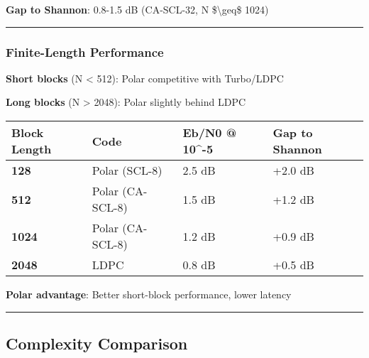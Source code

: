 \textbf{Gap to Shannon}: 0.8-1.5 dB (CA-SCL-32, N \$\textbackslash geq\$
1024)

\begin{center}\rule{0.5\linewidth}{0.5pt}\end{center}

\subsubsection{Finite-Length
Performance}\label{finite-length-performance}

\textbf{Short blocks} (N \textless{} 512): Polar competitive with
Turbo/LDPC

\textbf{Long blocks} (N \textgreater{} 2048): Polar slightly behind LDPC

{\def\LTcaptype{} %
\begin{longtable}[]{@{}llll@{}}
\toprule\noalign{}
Block Length & Code & Eb/N0 @ 10\^{}-5 & Gap to Shannon \\
\midrule\noalign{}
\endhead
\bottomrule\noalign{}
\endlastfoot
\textbf{128} & Polar (SCL-8) & 2.5 dB & +2.0 dB \\
\textbf{512} & Polar (CA-SCL-8) & 1.5 dB & +1.2 dB \\
\textbf{1024} & Polar (CA-SCL-8) & 1.2 dB & +0.9 dB \\
\textbf{2048} & LDPC & 0.8 dB & +0.5 dB \\
\end{longtable}
}

\textbf{Polar advantage}: Better short-block performance, lower latency

\begin{center}\rule{0.5\linewidth}{0.5pt}\end{center}

\subsection{Complexity Comparison}\label{complexity-comparison}

